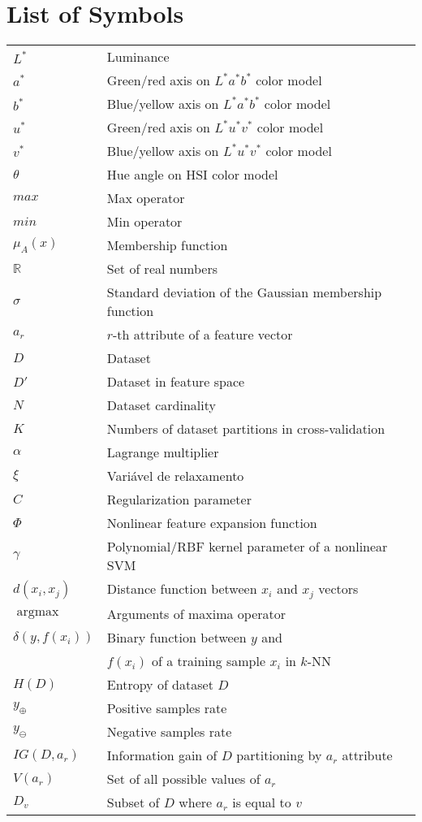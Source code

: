 \documentclass[11pt,twoside,a4paper]{book}
\theoremstyle{plain}
\theoremstyle{definition}
\DeclareMathOperator*{\argmax}{argmax}
\begin{document}
\chapter{List of Symbols}
\begin{tabular}{ll}
    $L^*$       & Luminance \\
    $a^*$       & Green/red axis on $L^*a^*b^*$ color model \\
    $b^*$       & Blue/yellow axis on $L^*a^*b^*$ color model \\
    $u^*$       & Green/red axis on $L^*u^*v^*$ color model \\
    $v^*$       & Blue/yellow axis on $L^*u^*v^*$ color model \\
    $\theta$    & Hue angle on HSI color model \\
    $max$       & Max operator \\
    $min$       & Min operator \\
    $\mu_A(x)$  & Membership function \\
    $\mathbb{R}$& Set of real numbers \\
    $\sigma$    & Standard deviation of the Gaussian membership function \\
    $a_r$       & $r$-th attribute of a feature vector \\
    $D$         & Dataset \\
    $D'$        & Dataset in feature space \\
    $N$         & Dataset cardinality \\
    $K$         & Numbers of dataset partitions in cross-validation \\
    $\alpha$    & Lagrange multiplier \\
    $\xi$       & Variável de relaxamento\\
    $C$         & Regularization parameter \\
    $\Phi$      & Nonlinear feature expansion function \\
    $\gamma$    & Polynomial/RBF kernel parameter of a nonlinear SVM \\
    $d(x_i, x_j)$ & Distance function between $x_i$ and $x_j$ vectors \\
    $\argmax$   & Arguments of maxima operator \\
    $\delta (y, f(x_i))$ & Binary function between $y$ and \\
                & $f(x_i)$ of a training sample $x_i$ in $k$-NN\\
    $H(D)$      & Entropy of dataset $D$\\
    $y_\oplus$  & Positive samples rate \\
    $y_\ominus$ & Negative samples rate \\
    $IG(D, a_r)$& Information gain of $D$ partitioning by $a_r$ attribute \\
    $V(a_r)$    & Set of all possible values of $a_r$\\
    $D_v$       & Subset of $D$ where $a_r$ is equal to $v$\\
\end{tabular}
\end{document}
